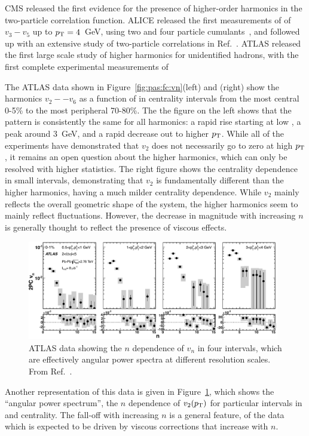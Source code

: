 CMS released the first evidence for the presence of higher-order harmonics in the two-particle
correlation function.  ALICE released the first measurements of of $v_3-v_5$ up to $\mbox{$p_{\mathrm{T}}$}=4$~GeV,
using two and four particle cumulants~\cite{ALICE:2011ab}, and followed up with an extensive study of two-particle
correlations in Ref.~\cite{Aamodt:2011by}.
ATLAS released the first large scale study of higher harmonics
for unidentified hadrons, with the first complete experimental measurements of

The ATLAS data shown in Figure~\ref{fig:pas:fc:vn}(left) and (right) show the harmonics $v_2 -- v_6$ as
a function of \pT in centrality intervals from the most central 0-5\% to the most peripheral 70-80\%.
The the figure on the left shows that the pattern is consistently the same for all harmonics:
a rapid rise starting at low \pT, a peak around 3~GeV, and a
rapid decrease out to higher $\mbox{$p_{\mathrm{T}}$}$.  While all of the experiments have demonstrated that $v_2$ does not
necessarily go to zero at high $\mbox{$p_{\mathrm{T}}$}$, it remains an open question about the higher harmonics, which can
only be resolved with higher statistics.
The right figure shows the centrality dependence in small \pT intervals, demonstrating that $v_2$ is fundamentally
different than the higher harmonics, having a much milder centrality dependence.  While $v_2$ mainly reflects
the overall geometric shape of the system, the higher harmonics seem to mainly reflect fluctuations.
However, the decrease in magnitude with increasing $n$ is generally thought to reflect the presence of viscous effects.

\begin{figure}[!tb]
\begin{center}
\includegraphics[width=0.98\textwidth]{flowcorrelations_figs/atlas_vn_fig_13.pdf}
\caption[]{
ATLAS data showing the $n$ dependence of $v_n$ in four \pT intervals, which are effectively
angular power spectra at different resolution scales.  From Ref.~\cite{ATLAS:2012at}.
}
\label{fig:pas:fc:powerspec}
\end{center}
\end{figure}
Another representation of this data is given in Figure~\ref{fig:pas:fc:powerspec}, which shows the ``angular power spectrum'',
the $n$ dependence of $v_2(\mbox{$p_{\mathrm{T}}$})$ for particular intervals in \pT and centrality.  The fall-off with increasing $n$ is a general
feature, of the data which is expected to be driven by viscous corrections that increase with $n$.

